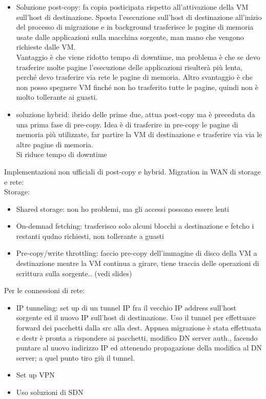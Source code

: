 \documentclass{article}
\begin{document}
\begin{itemize}
\item Soluzione post-copy: fa copia posticipata rispetto all'attivazione della VM sull'host di destinazione. Sposta l'esecuzione sull'host di destinazione all'inizio del processo di migrazione e in background trasferisce le pagine di memoria usate dalle applicazioni sulla macchina sorgente, man mano che vengono richieste dalle VM.\\ Vantaggio è che viene ridotto tempo di downtime, ma problema è che se devo trasferire molte pagine l'esecuzione delle applicazioni risulterà più lenta, perché devo trasferire via rete le pagine di memoria. Altro svantaggio è che non posso spegnere VM finché non ho trasferito tutte le pagine, quindi non è molto tollerante ai guasti.
\item soluzione hybrid: ibrido delle prime due, attua post-copy ma è preceduta da una prima fase di pre-copy. Idea è di trasferire in pre-copy le pagine di memoria più utilizzate, far partire la VM di destinazione e trasferire via via le altre pagine di memoria.\\ Si riduce tempo di downtime
\end{itemize}
Implementazioni non ufficiali di post-copy e hybrid.
Migration in WAN di storage e rete:\\
Storage:
\begin{itemize}
\item Shared storage: non ho problemi, ma gli accessi possono essere lenti
\item On-demnad fetching: trasferisco solo alcuni blocchi a destinazione e fetcho i restanti qudno richiesti,  non tollerante a guasti
\item Pre-copy/write throttling: faccio pre-copy dell'immagine di disco della VM a destinazione mentre la VM continua a girare, tiene traccia delle operazioni di scrittura sulla sorgente.. (vedi slides)
\end{itemize}
Per le connessioni di rete:
\begin{itemize}
\item IP tunneling: set up di un tunnel IP fra il vecchio IP address sull'host sorgente ed il nuovo IP sull'host di destinazione. Uso il tunnel per effettuare forward dei pacchetti dalla src alla dest. Appnea migrazione è stata effettuata e destr è pronta a rispondere ai pacchetti, modifico DN server auth., facendo puntare al nuovo indirizzo IP ed attenendo propagazione della modifica al DN server; a quel punto tiro giù il tunnel.
\item Set up VPN 
\item Uso soluzioni di SDN
\end{itemize}
\end{document}
